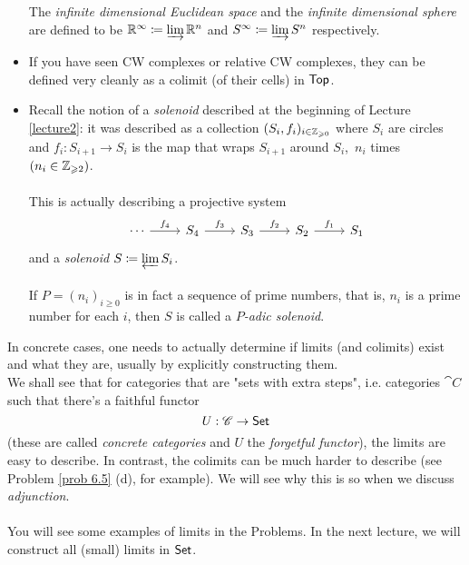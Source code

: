 \begin{example}
\begin{itemize}
The \emph{infinite dimensional Euclidean space} and the \emph{infinite dimensional sphere} are defined to be $\mathbb R^\infty \coloneqq \varinjlim \mathbb R^n$ and $S^\infty \coloneqq \varinjlim S^n$ respectively.
\item If you have seen CW complexes or relative CW complexes, they can be defined very cleanly as a colimit (of their cells) in $\mathsf{Top}$.
\item Recall the notion of a \emph{solenoid} described at the beginning of Lecture \ref{lecture2}: it was described as a collection $(S_i,f_i)_{i\in \mathbb Z_{\geqslant 0}}$ where $S_i$ are circles and $f_i:S_{i+1} \to S_i$ is the map that wraps $S_{i+1}$ around $S_i$,\ $n_i$ times $ (n_i \in \mathbb Z_{\geqslant 2})$.\\
\\
This is actually describing a projective system
\[\begin{tikzcd}[row sep=huge]
\cdots \arrow[r, "f_4"] & S_4 \arrow[r, "f_3"] & S_3 \arrow[r, "f_2"] & S_2 \arrow[r, "f_1"] & S_1
\end{tikzcd}\]
and a \emph{solenoid} $S \coloneqq \varprojlim S_i$.\\
\\
If $P = (n_i)_{i\geq 0}$ is in fact a sequence of prime numbers, that is, $n_i$ is a prime number for each $i$, then $S$ is called a \emph{$P$-adic solenoid}.
\end{itemize}
\end{example}

\vspace*{0.1in}

\begin{remark}
In concrete cases, one needs to actually determine if limits (and colimits) exist and what they are, usually by explicitly constructing them.\\[0.5em]
We shall see that for categories that are "sets with extra steps", i.e. categories $\cat{C}$ such that there's a faithful functor
\[U:\mathscr{C} \to \mathsf{Set}\]
(these are called \emph{concrete categories} and $U$ the \emph{forgetful functor}), the limits are easy to describe. In contrast, the colimits can be much harder to describe (see Problem \ref{prob 6.5} (d), for example). We will see why this is so when we discuss \emph{adjunction}.\\
\\
You will see some examples of limits in the Problems. In the next lecture, we will construct all (small) limits in $\mathsf{Set}$.
\end{remark}

